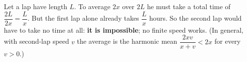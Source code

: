 Let a lap have length $L$. To average $2x$ over $2L$ he must take a total time of $\dfrac{2L}{2x}=\dfrac {L}{x}$. But the first lap alone already takes $\dfrac {L}{x}$ hours. So the second lap would have to take no time at all: \textbf{it is impossible}; no finite speed works. (In general, with second-lap speed $v$ the average is the harmonic mean $\dfrac{2xv}{x+v}<2x$ for every $v>0$.)
